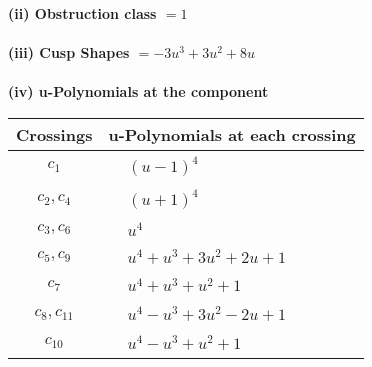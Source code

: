 \documentclass[1p]{elsarticle_modified}
\theoremstyle{definition}
\begin{document}
\flushleft \textbf{(ii) Obstruction class $= 1$}\\~\\
\flushleft \textbf{(iii) Cusp Shapes $= -3 u^3+3 u^2+8 u$}\\~\\
\newpage\renewcommand{\arraystretch}{1}
\flushleft \textbf{(iv) u-Polynomials at the component}\newline \\
\begin{tabular}{m{50pt}|m{274pt}}
Crossings & \hspace{64pt}u-Polynomials at each crossing \\
\hline $$\begin{aligned}c_{1}\end{aligned}$$&$\begin{aligned}
&(u-1)^4
\end{aligned}$\\
\hline $$\begin{aligned}c_{2},c_{4}\end{aligned}$$&$\begin{aligned}
&(u+1)^4
\end{aligned}$\\
\hline $$\begin{aligned}c_{3},c_{6}\end{aligned}$$&$\begin{aligned}
&u^4
\end{aligned}$\\
\hline $$\begin{aligned}c_{5},c_{9}\end{aligned}$$&$\begin{aligned}
&u^4+u^3+3 u^2+2 u+1
\end{aligned}$\\
\hline $$\begin{aligned}c_{7}\end{aligned}$$&$\begin{aligned}
&u^4+u^3+u^2+1
\end{aligned}$\\
\hline $$\begin{aligned}c_{8},c_{11}\end{aligned}$$&$\begin{aligned}
&u^4- u^3+3 u^2-2 u+1
\end{aligned}$\\
\hline $$\begin{aligned}c_{10}\end{aligned}$$&$\begin{aligned}
&u^4- u^3+u^2+1
\end{aligned}$\\
\hline
\end{tabular}\\~\\
\end{document}
